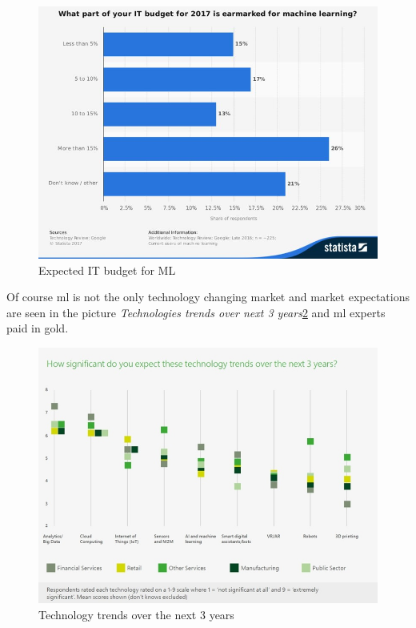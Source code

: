\documentclass[thesis=M,english]{FITthesis}[2012/06/26]
\begin{document}
\begin{figure}[h!]\centering
	\includegraphics[width=1\textwidth]{pictures/ml_budget}
	\caption{Expected IT budget for ML\cite{ml_realword}}\label{fig:ml_budget}
\end{figure}

Of course \acrshort{ml} is not the only technology changing market and market expectations are seen in the picture \textit{Technologies trends over next 3 years}\ref{fig:ml_changing_market} and \acrshort{ml} experts paid in gold.

\begin{figure}[h!]\centering
	\includegraphics[width=1\textwidth]{pictures/ml_changing_market}
	\caption{Technology trends over the next 3 years\cite{ml_realword}}\label{fig:ml_changing_market}
\end{figure}
\end{document}

